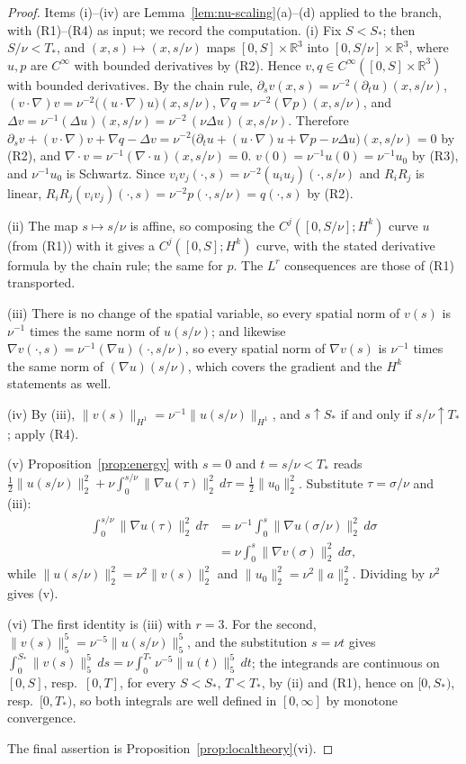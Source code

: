 \documentclass[11pt]{article}
\theoremstyle{definition}
\theoremstyle{plain}
\newcommand{\R}{\mathbb R}
\newcommand{\norm}[1]{\lVert #1\rVert}
\begin{document}
\begin{proof}
Items (i)--(iv) are Lemma~\ref{lem:nu-scaling}(a)--(d) applied to the branch,
with (R1)--(R4) as input; we record the computation.  (i) Fix $S<S_*$; then
$S/\nu<T_*$, and $(x,s)\mapsto(x,s/\nu)$ maps $[0,S]\times\R^3$ into
$[0,S/\nu]\times\R^3$, where $u,p$ are $C^\infty$ with bounded derivatives by
(R2).  Hence $v,q\in C^\infty([0,S]\times\R^3)$ with bounded derivatives.  By
the chain rule,
$\partial_sv(x,s)=\nu^{-2}(\partial_tu)(x,s/\nu)$,
$(v\cdot\nabla)v=\nu^{-2}\big((u\cdot\nabla)u\big)(x,s/\nu)$,
$\nabla q=\nu^{-2}(\nabla p)(x,s/\nu)$, and
$\Delta v=\nu^{-1}(\Delta u)(x,s/\nu)=\nu^{-2}\,(\nu\Delta u)(x,s/\nu)$.
Therefore
$\partial_sv+(v\cdot\nabla)v+\nabla q-\Delta v
=\nu^{-2}\big(\partial_tu+(u\cdot\nabla)u+\nabla p-\nu\Delta u\big)(x,s/\nu)=0$
by (R2), and $\nabla\cdot v=\nu^{-1}(\nabla\cdot u)(x,s/\nu)=0$.
$v(0)=\nu^{-1}u(0)=\nu^{-1}u_0$ by (R3), and $\nu^{-1}u_0$ is Schwartz.
Since $v_iv_j(\cdot,s)=\nu^{-2}(u_iu_j)(\cdot,s/\nu)$ and $R_iR_j$ is linear,
$R_iR_j(v_iv_j)(\cdot,s)=\nu^{-2}p(\cdot,s/\nu)=q(\cdot,s)$ by (R2).

(ii) The map $s\mapsto s/\nu$ is affine, so composing the $C^j([0,S/\nu];H^k)$
curve $u$ (from (R1)) with it gives a $C^j([0,S];H^k)$ curve, with the stated
derivative formula by the chain rule; the same for $p$.  The $L^r$
consequences are those of (R1) transported.

(iii) There is no change of the spatial variable, so every spatial norm of
$v(s)$ is $\nu^{-1}$ times the same norm of $u(s/\nu)$; and likewise
$\nabla v(\cdot,s)=\nu^{-1}(\nabla u)(\cdot,s/\nu)$, so every spatial norm of
$\nabla v(s)$ is $\nu^{-1}$ times the same norm of $(\nabla u)(s/\nu)$, which
covers the gradient and the $H^k$ statements as well.

(iv) By (iii), $\norm{v(s)}_{H^1}=\nu^{-1}\norm{u(s/\nu)}_{H^1}$, and
$s\uparrow S_*$ if and only if $s/\nu\uparrow T_*$; apply (R4).

(v) Proposition~\ref{prop:energy} with $s=0$ and $t=s/\nu<T_*$ reads
$\tfrac12\norm{u(s/\nu)}_2^2+\nu\int_0^{s/\nu}\norm{\nabla u(\tau)}_2^2\,d\tau
=\tfrac12\norm{u_0}_2^2$.  Substitute $\tau=\sigma/\nu$ and (iii):
\[
\begin{aligned}
 \int_0^{s/\nu}\norm{\nabla u(\tau)}_2^2\,d\tau
 &=\nu^{-1}\int_0^s\norm{\nabla u(\sigma/\nu)}_2^2\,d\sigma\\
 &=\nu\int_0^s\norm{\nabla v(\sigma)}_2^2\,d\sigma,
\end{aligned}
\]
while
$\norm{u(s/\nu)}_2^2=\nu^2\norm{v(s)}_2^2$ and $\norm{u_0}_2^2=\nu^2\norm a_2^2$.
Dividing by $\nu^2$ gives (v).

(vi) The first identity is (iii) with $r=3$.  For the second,
$\norm{v(s)}_5^5=\nu^{-5}\norm{u(s/\nu)}_5^5$, and the substitution $s=\nu t$
gives $\int_0^{S_*}\norm{v(s)}_5^5\,ds=\nu\int_0^{T_*}\nu^{-5}\norm{u(t)}_5^5\,dt$;
the integrands are continuous on $[0,S]$, resp.\ $[0,T]$, for every $S<S_*$,
$T<T_*$, by (ii) and (R1), hence on $[0,S_*)$, resp.\ $[0,T_*)$, so both
integrals are well defined in $[0,\infty]$ by monotone convergence.

The final assertion is Proposition~\ref{prop:localtheory}(vi).
\end{proof}
\end{document}
